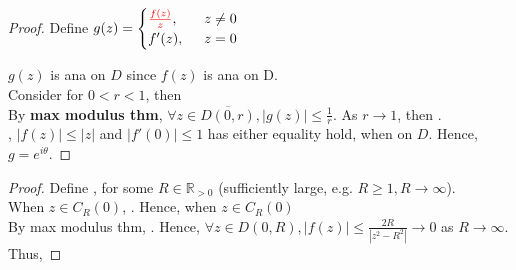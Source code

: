 \documentclass[12pt,a4paper]{article}
\begin{document}
\begin{proof}
  Define $g(z) = \begin{cases}
    {\textcolor{red}{\frac{f(z)}{z}}}, \quad &z \neq 0 \\
    f'(z), &z = 0
  \end{cases}$

  \noindent $g(z)$ is ana on $D$ since $f(z)$ is ana on D. \\

  \noindent Consider  for $0 < r < 1$, then  \\

  \noindent By \textbf{max modulus thm}, $\forall z \in \overline{D(0, r)}, |g(z)| \leq \frac{1}{r}$. As $r \to 1$, then . \\

  \noindent {}, $|f(z)| \leq |z|$ and $|f'(0)| \leq 1$ has either equality hold, when  on $D$. Hence, $g = e^{i\theta}$.
\end{proof}



\begin{proof}
  Define , for some $R \in \mathbb{R}_{> 0}$ (sufficiently large, e.g. $R \geq 1, R \to \infty$). \\

  \noindent When $z \in C_R(0)$, . Hence,  when $z \in C_R(0)$ \\

  \noindent By max modulus thm, . Hence, $\forall z \in D(0, R), |f(z)| \leq \frac{2R}{|z^2 - R^2|} \to 0$ as $R \to \infty$. Thus, 
\end{proof}

\vspace{1.0em}


\end{document}
